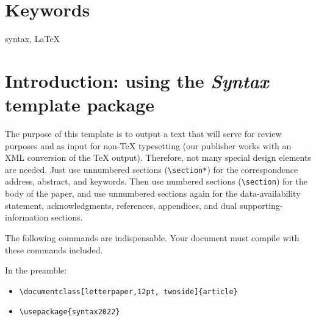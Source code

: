 \documentclass[letterpaper,12pt, twoside]{article}
\begin{document}
\section*{Keywords}
syntax, LaTeX

\tableofcontents


\section{Introduction: using the \emph{Syntax} template package}
The purpose of this template is to output a text that will serve for review purposes and as input for non-TeX typesetting (our publisher works with an XML conversion of the TeX output). Therefore, not many special design elements are needed. Just use unnumbered sections (\verb|\section*|) for the correspondence address, abstract, and keywords. Then use numbered sections  (\verb|\section|) for the body of the paper, and use unnumbered sections again for the data-availability statement, acknowledgments, references, appendices, and dual supporting-information sections.

The following commands are indispensable. Your document must compile with these commands included.

In the preamble:

\begin{itemize}
\item \verb|\documentclass[letterpaper,12pt, twoside]{article}|
\item \verb|\usepackage{syntax2022}| %
\end{itemize}
\end{document}
